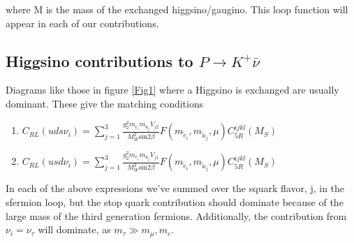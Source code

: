 \documentclass[aps,onecolumn,twoside,secnumarabic,balancelastpage,amsmath,amssymb,nofootinbib,hyperref=pdftex]{revtex4}
\begin{document}
where M is the mass of the exchanged higgsino/gaugino. This loop function will appear in each of our contributions.

\subsection{Higgsino contributions to $P\rightarrow K^{+}\bar{\nu}$}
Diagrams like those in figure \ref{Fig1} where a Higgsino is exchanged are usually dominant. These give the matching conditions

\begin{enumerate}
\item $C_{RL}(uds\nu_{i}) = \sum_{j=1}^{3} \frac{g_{2}^{2}m_{e_{i}}m_{u_{j}}V_{j2}}{M_{W}^{2}\text{sin}2\beta}F(m_{\tilde{e}_{i}}, m_{\tilde{u}_{j}}, \mu) C^{ijkl}_{5R}(M_{S})$
\item $C_{RL}(usd\nu_{i}) = \sum_{j=1}^{3} \frac{g_{2}^{2}m_{e_{i}}m_{u_{j}}V_{j1}}{M_{W}^{2}\text{sin}2\beta}F(m_{\tilde{e}_{i}}, m_{\tilde{u}_{j}}, \mu) C^{ijkl}_{5R}(M_{S})$
\end{enumerate}

In each of the above expressions we've summed over the squark flavor, j, in the sfermion loop, but the stop quark contribution should dominate because of the large mass of the third generation fermions. Additionally, the contribution from $\nu_{i} = \nu_{\tau}$ will dominate, as $m_{\tau} \gg m_{\mu},m_{e}$.
\end{document}
